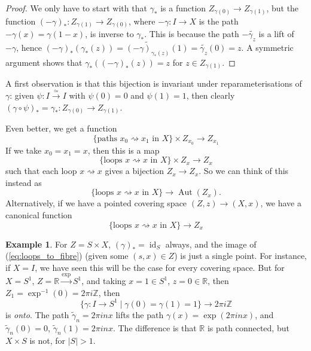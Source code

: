 \documentclass{tufte-handout}
\def\RR{\mathbb{R}}
\def\ZZ{\mathbb{Z}}
\newcommand{\lecturenum}[1]{\marginnote{\color{red}Lecture #1}}
\DeclareMathOperator{\id}{id}
\DeclareMathOperator{\Aut}{Aut}
\theoremstyle{definition}
\newtheorem{example}{Example}
\begin{document}
\begin{proof}
We only have to start with that $\gamma_*$ is a function $Z_{\gamma(0)} \to 
Z_{\gamma(1)}$, but the function $(-\gamma)_*\colon Z_{\gamma(1)} \to Z_{\gamma(0)}$, 
where $-\gamma\colon I \to X$ is the path $-\gamma(x) = \gamma(1-x)$, is inverse to 
$\gamma_*$. This is because the path $-\widetilde{\gamma_z}$ is a lift of $-\gamma$, 
hence $(-\gamma)_*(\gamma_*(z)) = \widetilde{(-\gamma)_{\gamma_*(z)}}(1) = 
\widetilde{\gamma_z}(0) = z$. A symmetric argument shows that 
$\gamma_*\left((-\gamma)_*(z)\right)=z$ for $z\in Z_{\gamma(1)}$.
\end{proof}

A first observation is that this bijection is invariant under reparameterisations of $\gamma$:
given $\psi\colon I\xrightarrow{\simeq} I$ with $\psi(0)=0$ and $\psi(1)=1$, then clearly 
$(\gamma\circ \psi)_*=\gamma_*\colon Z_{\gamma(0)} \to Z_{\gamma(1)}$.

Even\lecturenum{6} better, we get a function 
\[
\{\text{paths }x_0 \rightsquigarrow x_1\text{ in }X\} \times Z_{x_0} \to Z_{x_1}
\]
If we take $x_0 = x_1 = x$, then this is a map
\[
\{\text{loops }x \rightsquigarrow x\text{ in }X\} \times Z_x \to Z_x
\]
such that each loop $x\rightsquigarrow x$ gives a bijection $Z_x\to Z_x$. So we can think of this instead as 
\[
\{\text{loops }x \rightsquigarrow x\text{ in }X\} \to \Aut(Z_x).
\]
Alternatively, if we have a pointed covering space $(Z,z) \to (X,x)$, we have a canonical function
\begin{equation}\label{eq:loops_to_fibre}
\{\text{loops }x \rightsquigarrow x\text{ in }X\} \to Z_x
\end{equation}

\begin{example}
For $Z = S\times X$, $(\gamma)_* = \id_S$ always, and the image of (\ref{eq:loops_to_fibre}) 
(given some $(s,x)\in Z$) is just a single point. For instance, if $X=I$, we have seen this 
will be the case for every covering space.
But for $X=S^1$, $Z=\RR \xrightarrow{\exp} S^1$, and taking 
$x=1\in S^1$, $z = 0\in \RR$, then $Z_1 = \exp^{-1}(0) = 2\pi i \ZZ$, then 
\[
	\{\gamma\colon I\to S^1\mid \gamma(0) = \gamma(1) = 1\} \to 2\pi i \ZZ
\]
is \emph{onto}. The path $\widetilde{\gamma}_n = 2\pi inx$ lifts the path 
$\gamma(x) = \exp(2\pi inx)$,
and $\widetilde{\gamma}_n(0) = 0$, $\widetilde{\gamma}_n(1) = 2\pi inx$. 
The difference is that $\RR$ is path connected, but $X\times S$ is not, for $|S| > 1$. 
\end{example}
\end{document}
